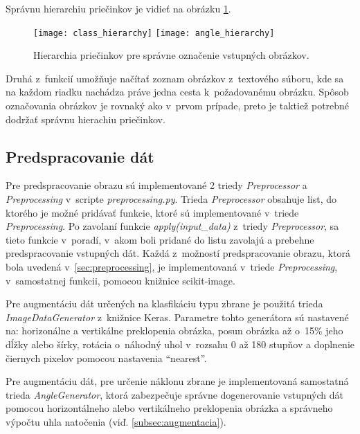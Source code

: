 Správnu hierarchiu priečinkov je vidieť na obrázku \ref{pic:folderhierarchy}.

\begin{figure}[H]
    \centering
    \texttt{[image: class\_hierarchy]}
    \qquad
    \texttt{[image: angle\_hierarchy]}
    \caption{Hierarchia priečinkov pre správne označenie vstupných obrázkov.}
    \label{pic:folderhierarchy}
\end{figure}

Druhá z~funkcií umožňuje načítať zoznam obrázkov z~textového súboru, kde sa na každom riadku nachádza práve jedna cesta k~požadovanému obrázku.
Spôsob označovania obrázkov je rovnaký ako v~prvom prípade, preto je taktiež potrebné dodržať správnu hierachiu priečinkov.

\subsection{Predspracovanie dát}
\label{subsec:predspracovaniedat}
Pre predspracovanie obrazu sú implementované 2 triedy \textit{Preprocessor} a \textit{Preprocessing} v~scripte \textit{preprocessing.py}.
Trieda \textit{Preprocessor} obsahuje list, do ktorého je možné pridávať funkcie, ktoré sú implementované v~triede \textit{Preprocessing}.
Po zavolaní funkcie \textit{apply(input\_data)} z~triedy \textit{Preprocessor}, sa tieto
    funkcie v~poradí, v~akom boli pridané do listu zavolajú a prebehne predspracovanie vstupných dát.
Každá z~možností predspracovanie obrazu, ktorá bola uvedená v~\ref{sec:preprocessing}, je implementovaná v~triede \textit{Preprocessing}, v~samostatnej funkcii,
    pomocou knižnice scikit-image.

Pre augmentáciu dát určených na klasfikáciu typu zbrane je použitá trieda \textit{ImageDataGenerator} z~knižnice Keras.
Parametre tohto generátora sú nastavené na: horizonálne a vertikálne preklopenia obrázka, posun obrázka až o~15\% jeho dĺžky alebo šírky,
    rotácia o~náhodný uhol v~rozsahu 0 až 180 stupňov a doplnenie čiernych pixelov pomocou nastavenia ``nearest''.

Pre augmentáciu dát, pre určenie náklonu zbrane je implementovaná samostatná trieda \textit{AngleGenerator}, ktorá zabezpečuje správne dogenerovanie
    vstupných dát pomocou horizontálneho alebo vertikálneho preklopenia obrázka a správneho výpočtu uhla natočenia (viď. \ref{subsec:augmentacia}).
